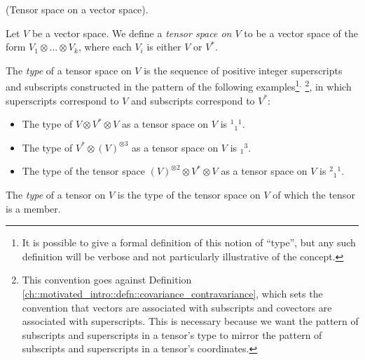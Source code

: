 \begin{defn}
\label{ch::motivated_intro::defn::tensor_space_on_a_vector_space}
    (Tensor space on a vector space).
    
    Let $V$ be a vector space. We define a \textit{tensor space on $V$} to be a vector space of the form $V_1 \otimes ... \otimes V_k$, where each $V_i$ is either $V$ or $V^*$.
    
    The \textit{type} of a tensor space on $V$ is the sequence of positive integer superscripts and subscripts constructed in the pattern of the following examples\footnote{It is possible to give a formal definition of this notion of ``type'', but any such definition will be verbose and not particularly illustrative of the concept.}$^{,}$ \footnote{This convention goes against Definition \ref{ch::motivated_intro::defn::covariance_contravariance}, which sets the convention that vectors are associated with subscripts and covectors are associated with superscripts. This is necessary because we want the pattern of subscripts and superscripts in a tensor's type to mirror the pattern of subscripts and superscripts in a tensor's coordinates.}, in which     superscripts correspond to $V$ and subscripts correspond to $V^*$:
    
    \begin{itemize}
        \item The type of $V \otimes V^* \otimes V$ as a tensor space on $V$ is $^1{}_1{}^1$.
        \item The type of $V^* \otimes (V)^{\otimes 3}$ as a tensor space on $V$ is $_1{}^3$.
        \item The type of the tensor space $(V)^{\otimes 2} \otimes V^* \otimes V$ as a tensor space on $V$ is $^2{}_1{}^1$.
    \end{itemize}
    
    The \textit{type} of a tensor on $V$ is the type of the tensor space on $V$ of which the tensor is a member.
\end{defn}

